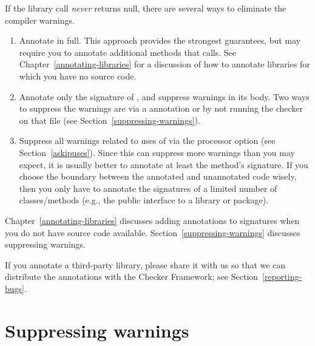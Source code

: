 If the library call \emph{never} returns null,
there are several ways to eliminate the compiler warnings.
\begin{enumerate}
\item Annotate  in full.  This approach provides
  the strongest guarantees, but may require you to annotate additional
  methods that  calls.  See
  Chapter~\ref{annotating-libraries} for a discussion of how to annotate
  libraries for which you have no source code.
\item Annotate only the signature of , and
  suppress warnings in its body.  Two ways to suppress the warnings are via a
   annotation or by not running the checker on that
  file (see Section~\ref{suppressing-warnings}).
\item Suppress all warnings related to uses of 
  via the  processor option
  (see Section~\ref{askipuses}).
  Since this can suppress more warnings than you may expect,
  it is usually better to annotate at least the method's signature.  If you
  choose the boundary between the annotated and unannotated code wisely,
  then you only have to annotate the signatures of a limited number of
  classes/methods
  (e.g., the public interface to a library or package).

\end{enumerate}

Chapter~\ref{annotating-libraries} discusses adding annotations to
signatures when you do not have source code available.
Section~\ref{suppressing-warnings} discusses suppressing warnings.


If you annotate a third-party library, please share it with us so that we
can distribute the annotations with the Checker Framework; see
Section~\ref{reporting-bugs}.


\section{Suppressing warnings\label{suppressing-warnings}}

